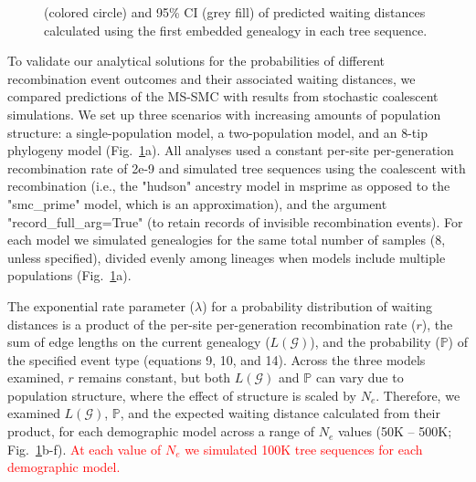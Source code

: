 \documentclass[11pt]{article}
\begin{document}
\begin{figure}[tp]
{		(colored circle) and 95\% CI (grey fill) of predicted waiting distances calculated
		using the first embedded genealogy in each tree sequence.
	}
	\label{fig:fig-validation}
\end{figure}


To validate our analytical solutions for the probabilities of different 
recombination event outcomes and their associated waiting distances, 
we compared predictions of the MS-SMC with results from stochastic 
coalescent simulations. 
We set up three scenarios with increasing amounts of population structure: 
a single-population model, a two-population model, and an 8-tip phylogeny model
(Fig.~\ref{fig:fig-validation}a). 
All analyses used a constant per-site per-generation recombination rate of 
2e-9 and simulated tree sequences using the coalescent with recombination 
(i.e., the "hudson" ancestry model in msprime as opposed to the "smc\_prime" model, 
which is an approximation), %
and the argument 
"record\_full\_arg=True" (to retain records of invisible recombination events). 
For each model we simulated genealogies for the same total number of samples
(8, unless specified), divided evenly among lineages when models 
include multiple populations (Fig.~\ref{fig:fig-validation}a). 


The exponential rate parameter ($\lambda$) for a probability distribution of waiting distances 
is a product of the per-site per-generation recombination rate ($r$), the sum 
of edge lengths on the current genealogy ($L(\mathcal{G})$), and the probability 
($\mathbb{P}$) of the specified event type (equations 9, 10, and 14). 
Across the three models examined, $r$ remains constant, but both $L(\mathcal{G})$ 
and $\mathbb{P}$ can vary due to population structure, where the effect of 
structure is scaled by $N_e$. 
Therefore, we examined $L(\mathcal{G})$, $\mathbb{P}$, and the expected waiting 
distance calculated from their product, for each demographic model across a range 
of $N_e$ values (50K -- 500K; Fig.~\ref{fig:fig-validation}b-f). 
% 
\textcolor{red}{At each value of $N_e$ we simulated 100K tree sequences for each
demographic model.}
\end{document}
